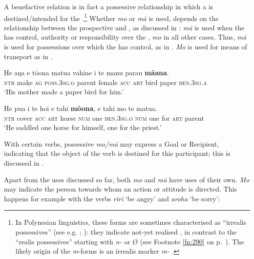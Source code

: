 A benefactive relation is in fact a possessive relationship in which a  is destined/intended for the .\footnote{\label{fn:235}In Polynesian linguistics, these forms are sometimes characterised as “irrealis possessives” (see e.g. \citealt{Clark2000Possessive}; \citealt[48]{Wilson1982}): they indicate not-yet realised , in contrast to the “realis possessives” starting with \textit{n-} or Ø (see Footnote \ref{fn:290} on p.~\pageref{fn:290}). The likely origin of the \textit{m}{}-forms is an irrealis marker \textit{m-} \citep[115]{Clark1976}.} Whether \textit{mo} or \textit{mā} is used, depends on the relationship between the prospective  and , as discussed in : \textit{mā} is used when the  has control, authority or responsibility over the , \textit{mo} in all other cases. Thus, \textit{mā} is used for possessions over which the  has control, as in . \textit{Mo} is used for means of transport as in .

\ea\label{ex:4.284}
\gll He aŋa e tō{\ꞌ}ona matu{\ꞌ}a vahine i te manu parau \textbf{mā{\ꞌ}ana}.\\
 \textsc{ntr} make \textsc{ag} \textsc{poss.3sg.o} parent female \textsc{acc} \textsc{art} bird paper \textsc{ben.3sg.a}\\

\glt 
‘His mother made a paper bird for him.’ \textstyleExampleref{[R476.002]} 
\z

\ea\label{ex:4.285}
\gll He pu{\ꞌ}a i te hoi e tahi \textbf{mō{\ꞌ}ona}, e tahi mo te matu{\ꞌ}a.\\
\textsc{ntr} cover \textsc{acc} \textsc{art} horse \textsc{num} one \textsc{ben.3sg.o} \textsc{num} one for \textsc{art} parent\\

\glt 
‘He saddled one horse for himself, one for the priest.’ \textstyleExampleref{[R167.001]} 
\z

With certain verbs, possessive \textit{mo/mā} may express a Goal or Recipient, indicating that the object of the verb is destined for this participant; this is discussed in . 

Apart from the uses discussed so far, both \textit{mo} and \textit{mā} have uses of their own. \textit{Mo} may indicate the person towards whom an action or attitude is directed. This happens for example with the verbs \textit{riri} ‘be angry’ and \textit{{\ꞌ}aroha} ‘be sorry’:

